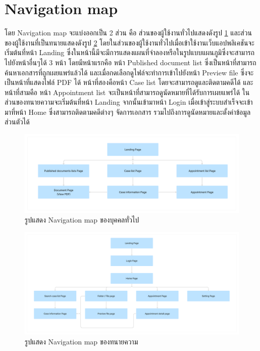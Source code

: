 \documentclass[12pt,oneside,openright,a4paper]{cpe-thai-project}
\begin{document}
\section{Navigation map}
\hspace{1cm} โดย Navigation map จะแบ่งออกเป็น 2 ส่วน คือ ส่วนของผู้ใช้งานทั่วไปแสดงดังรูป \ref{fig:navMapGuest} และส่วนของผู้ใช้งานที่เป็นทนายแสดงดังรูป \ref{fig:navMapLawyer} โดยในส่วนของผู้ใช้งานทั่วไปเมื่อเข้าใช้งานเว็บแอปพลิเคชันจะเริ่มต้นที่หน้า Landing ซึ่งในหน้านี้มีจะมีการแสดงแผนที่จำลองหรือในรูปแบบแผนภูมิซึ่งจะสามารถไปยังหน้าอื่นๆได้ 3 หน้า โดยมีหน้าแรกคือ 
หน้า Published document list ซึ่งเป็นหน้าที่สามารถค้นหาเอกสารที่ถูกเผยแพร่แล้วได้ และเมื่อกดเลือกดูไฟล์จะทำการเข้าไปยังหน้า Preview file ซึ่งจะเป็นหน้าที่แสดงไฟล์ PDF ได้ หน้าที่สองคือหน้า Case list โดยจะสามารถดูและติดตามคดีได้ และหน้าที่สามคือ หน้า Appointment list จะเป็นหน้าที่สามารถดูนัดหมายที่ได้รับการเผยแพร่ได้ \hspace{1cm}ในส่วนของทนายความจะเริ่มต้นที่หน้า Landing จากนั้นเข้ามาหน้า Login เมื่อเข้าสู่ระบบสำเร็จจะเข้ามาที่หน้า Home ซึ่งสามารถติดตามคดีต่างๆ จัดการเอกสาร รวมไปถึงการดูนัดหมายและตั้งค่าข้อมูลส่วนตัวได้
\begin{figure}[!h]\centering
    \includegraphics[width=13cm]{./assets/nav-map-guest.png}
    \caption{รูปแสดง Navigation map ของบุคคลทั่วไป}\label{fig:navMapGuest}

  \end{figure}

\begin{figure}[!h]\centering
    \includegraphics[width=13cm]{./assets/nav-map-lawyer.png}
    \caption{รูปแสดง Navigation map ของทนายความ}\label{fig:navMapLawyer}
\end{figure}
  
\end{document}
